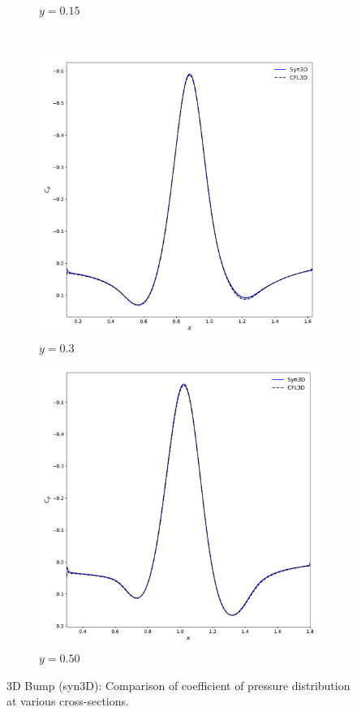 \begin{figure}[ht!]
\begin{subfigure}{.45\textwidth}
  \caption{$y=0.15$}
\end{subfigure}
\\
\begin{subfigure}{.45\textwidth}
  \centering
  \includegraphics[width=1.0\textwidth]{figs/3dbump/cop030.pdf}
  \caption{$y=0.3$}
\end{subfigure}%
\begin{subfigure}{.45\textwidth}
  \centering
  \includegraphics[width=1.0\textwidth]{figs/3dbump/cop050.pdf}
  \caption{$y=0.50$}
\end{subfigure}
\caption{3D Bump (syn3D): Comparison of coefficient of pressure distribution at various cross-sections.}
\label{fig:syn3dbumpcp}
\end{figure}
